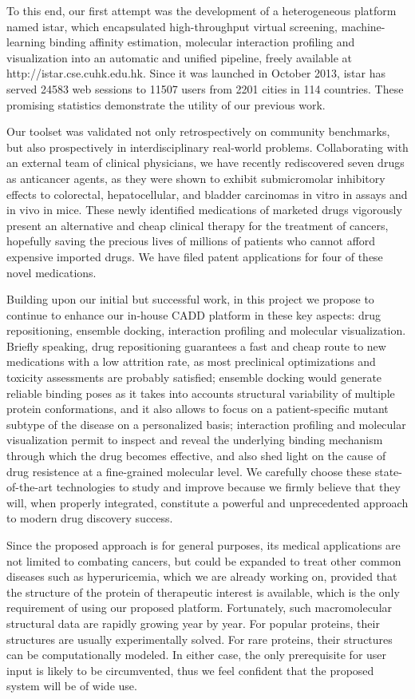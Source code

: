 \documentclass[a4paper,12pt]{article}
\begin{document}
To this end, our first attempt was the development of a heterogeneous platform named istar, which encapsulated high-throughput virtual screening, machine-learning binding affinity estimation, molecular interaction profiling and visualization into an automatic and unified pipeline, freely available at http://istar.cse.cuhk.edu.hk. Since it was launched in October 2013, istar has served 24583 web sessions to 11507 users from 2201 cities in 114 countries. These promising statistics demonstrate the utility of our previous work.

Our toolset was validated not only retrospectively on community benchmarks, but also prospectively in interdisciplinary real-world problems. Collaborating with an external team of clinical physicians, we have recently rediscovered seven drugs as anticancer agents, as they were shown to exhibit submicromolar inhibitory effects to colorectal, hepatocellular, and bladder carcinomas in vitro in assays and in vivo in mice. These newly identified medications of marketed drugs vigorously present an alternative and cheap clinical therapy for the treatment of cancers, hopefully saving the precious lives of millions of patients who cannot afford expensive imported drugs. We have filed patent applications for four of these novel medications.

Building upon our initial but successful work, in this project we propose to continue to enhance our in-house CADD platform in these key aspects: drug repositioning, ensemble docking, interaction profiling and molecular visualization. Briefly speaking, drug repositioning guarantees a fast and cheap route to new medications with a low attrition rate, as most preclinical optimizations and toxicity assessments are probably satisfied; ensemble docking would generate reliable binding poses as it takes into accounts structural variability of multiple protein conformations, and it also allows to focus on a patient-specific mutant subtype of the disease on a personalized basis; interaction profiling and molecular visualization permit to inspect and reveal the underlying binding mechanism through which the drug becomes effective, and also shed light on the cause of drug resistence at a fine-grained molecular level. We carefully choose these state-of-the-art technologies to study and improve because we firmly believe that they will, when properly integrated, constitute a powerful and unprecedented approach to modern drug discovery success.

Since the proposed approach is for general purposes, its medical applications are not limited to combating cancers, but could be expanded to treat other common diseases such as hyperuricemia, which we are already working on, provided that the structure of the protein of therapeutic interest is available, which is the only requirement of using our proposed platform. Fortunately, such macromolecular structural data are rapidly growing year by year. For popular proteins, their structures are usually experimentally solved. For rare proteins, their structures can be computationally modeled. In either case, the only prerequisite for user input is likely to be circumvented, thus we feel confident that the proposed system will be of wide use.
\end{document}
